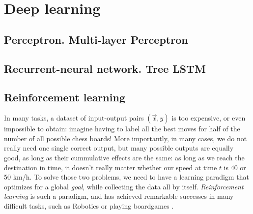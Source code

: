 \section{Deep learning}
\subsection{Perceptron. Multi-layer Perceptron}
\subsection{Recurrent-neural network. Tree LSTM}
\subsection{Reinforcement learning}
In many tasks, a dataset of input-output pairs $(\vec{x}, y)$ is too expensive, or even impossible to obtain: imagine having to label all the best moves for half of the number of all possible chess boards! More importantly, in many cases, we do not really need one single correct output, but many possible outputs are equally good, as long as their cummulative effects are the same: as long as we reach the destination in time, it doesn't really matter whether our speed at time $t$ is 40 or 50 km/h. To solve those two problems, we need to have a learning paradigm that optimizes for a global \emph{goal}, while collecting the data all by itself. \emph{Reinforcement learning} is such a paradigm, and has achieved remarkable successes in many difficult tasks, such as Robotics \cite{convai} or playing boardgames \cite{td-gammon, alphago}.
